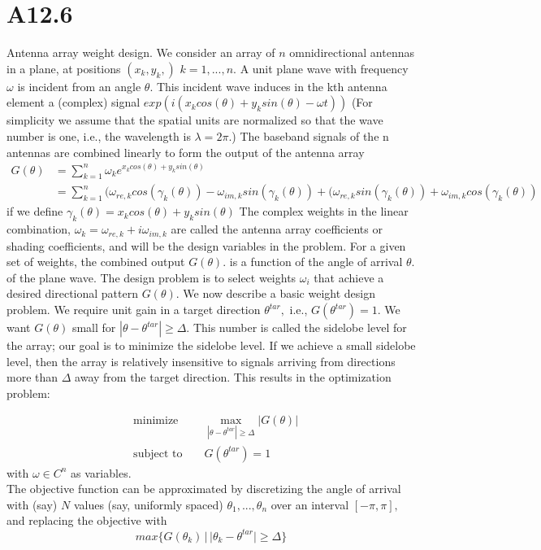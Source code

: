 \documentclass{article}
\begin{document}
\section*{A12.6} 
Antenna array weight design. We consider an array of $n$ omnidirectional antennas in a plane, at positions
$(x_k, y_k,)$ $k = 1, ..., n.$ 
A unit plane wave with frequency $\omega$ is incident from an angle $\theta$. This incident wave induces in
the kth antenna element a (complex) signal
$exp(i(x_k cos(\theta) + y_k sin(\theta) - \omega t))$ (For
simplicity we assume that the spatial units are normalized so that the wave number is one, i.e., the
wavelength is $\lambda = 2 \pi.$) The baseband signals of the n antennas are combined linearly to form the output of the antenna array 
\begin{align*}
G(\theta) & = \sum_{k = 1}^n \omega_k 
e^{x_k cos(\theta) + y_k sin(\theta)}  \\ 
& = 
\sum_{k = 1}^n (\omega_{re, k} cos(\gamma_k(\theta)) 
- \omega_{im, k} sin(\gamma_k(\theta)) + 
(\omega_{re, k} sin(\gamma_k(\theta)) 
+ \omega_{im, k} cos(\gamma_k(\theta))
\end{align*}
if we define 
$\gamma_k(\theta) = x_k cos(\theta) + y_k sin(\theta)$
The complex weights in the linear combination,
$\omega_k = \omega_{re, k} + i \omega_{im, k}$ are called the antenna array coefficients or shading coefficients, and will be the design variables in the problem. For a given set of weights, the combined output $G(\theta).$ is a function of the angle
of arrival $\theta.$ of the plane wave. The design problem is to select weights $\omega_i$ that achieve a desired
directional pattern $G(\theta).$ We now describe a basic weight design problem. We require unit gain in a target direction
$\theta^{tar}, $ i.e., $G(\theta^{tar}) = 1.$ We want 
$G(\theta)$ small for $|\theta - \theta^{tar}| \geq \Delta.$ This number is called the sidelobe level for the array; our goal is to minimize the sidelobe level. If we achieve a small sidelobe level, then the array is relatively insensitive to signals arriving from directions more than $\Delta$ away from the target direction. This results in the optimization problem:

\begin{align*}
&\text{minimize } && 
\max_{|\theta - \theta^{tar}| \geq \Delta} |G(\theta)|\\
&\text{subject to } 
&& G(\theta^{tar}) = 1
\end{align*}
with $\omega \in C^n$ as variables. \\
The objective function can be approximated by discretizing the angle of arrival with (say) $N$ values (say, uniformly spaced)
$\theta_1, ..., \theta_n$ over an interval $[-\pi, \pi],$ and replacing the objective with 
$$
max\{G(\theta_k) \, | \, |\theta_k - \theta^{tar}| \geq \Delta\}
$$
\end{document}
